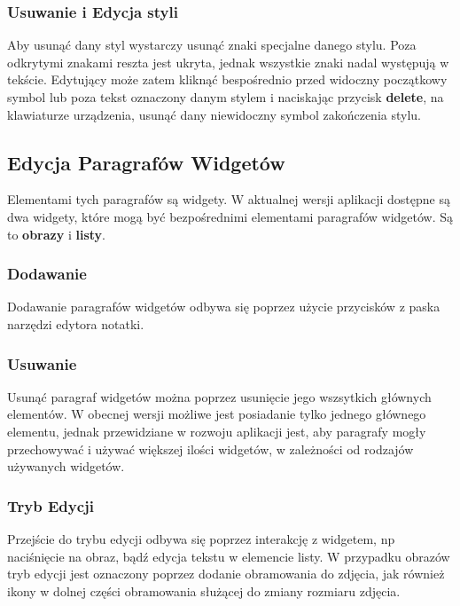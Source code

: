 \subsubsection{Usuwanie i Edycja styli}

Aby usunąć dany styl wystarczy usunąć znaki specjalne danego stylu. Poza odkrytymi znakami reszta jest ukryta, jednak wszystkie znaki nadal występują w tekście. Edytujący może zatem kliknąć bespośrednio przed widoczny początkowy symbol lub poza tekst oznaczony danym stylem i naciskając przycisk \textbf{delete}, na klawiaturze urządzenia, usunąć dany niewidoczny symbol zakończenia stylu.

\pagebreak

\subsection{Edycja Paragrafów Widgetów}

Elementami tych paragrafów są widgety. W aktualnej wersji aplikacji dostępne są dwa widgety, które mogą być bezpośrednimi elementami paragrafów widgetów.
Są to \textbf{obrazy} i \textbf{listy}.

\subsubsection{Dodawanie}

Dodawanie paragrafów widgetów odbywa się poprzez użycie przycisków z paska narzędzi edytora notatki.

\subsubsection{Usuwanie}

Usunąć paragraf widgetów można poprzez usunięcie jego wszsytkich głównych elementów. W obecnej wersji możliwe jest posiadanie tylko jednego głównego elementu, jednak przewidziane w rozwoju aplikacji jest, aby paragrafy mogły przechowywać i używać większej ilości widgetów, w zależności od rodzajów używanych widgetów.

\subsubsection{Tryb Edycji}

Przejście do trybu edycji odbywa się poprzez interakcję z widgetem, np naciśnięcie na obraz, bądź edycja tekstu w elemencie listy.
W przypadku obrazów tryb edycji jest oznaczony poprzez dodanie obramowania do zdjęcia, jak również ikony w dolnej części obramowania służącej do zmiany rozmiaru zdjęcia.

